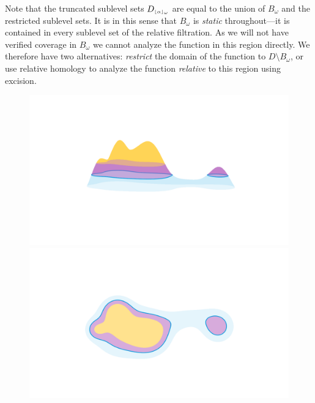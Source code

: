 Note that the truncated sublevel sets $D_{\scriptscriptstyle \lfloor\alpha\rfloor_{\omega}}$ are equal to the union of $B_\omega$ and the restricted sublevel sets.
It is in this sense that $B_\omega$ is \emph{static} throughout---it is contained in every sublevel set of the relative filtration.
As we will not have verified coverage in $B_\omega$ we cannot analyze the function in this region directly.
We therefore have two alternatives: \emph{restrict} the domain of the function to $D\setminus B_\omega$, or use relative homology to analyze the function \emph{relative} to this region using excision.

\begin{figure}[htbp]
  \centering
  \begin{minipage}[b]{0.27\textwidth}
    \includegraphics[trim=200 200 200 100, clip, width=\textwidth]{scripts/figures/surf/ass2_C_side.png}\\
    \includegraphics[trim=200 100 200 200, clip, width=\textwidth]{scripts/figures/surf/ass2_C_top.png}
  \end{minipage}
  \begin{minipage}[b]{0.7\textwidth}

\end{minipage}
\end{figure}

